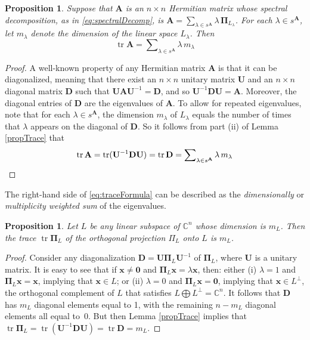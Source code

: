 \documentclass[11pt]{article}
\newcommand \C { \mathbb{C} }
\DeclareMathOperator{\tr}{tr}
\newtheorem{proposition}[theorem]{Proposition}
\begin{document}
\begin{proposition} \label{prop:trace}
	Suppose that $ \mathbf A$ is an $n \times n$ Hermitian matrix 
	whose spectral decomposition, as in \eqref{eq:spectralDecomp},
	is \( \mathbf A = \sum\nolimits _{ \lambda \in s^{ \mathbf A} } 
			\lambda \, \boldsymbol \Pi _{ L_\lambda } \). 
	For each $ \lambda \in s^{ \mathbf A} $, let $ m_\lambda $ denote 
	the dimension of the linear space $ L_\lambda $.
	Then 
\begin{equation} \label{eq:traceFormula}
	\tr \mathbf A = \sum\nolimits _{ \lambda \in s^{ \mathbf A} } \lambda \, m_\lambda
\end{equation}
\end{proposition}

\begin{proof} 
	A well-known property of any Hermitian matrix $ \mathbf A$ is that it can be diagonalized, 
	meaning that there exist an $n \times n$ unitary matrix $ \mathbf U$ 
	and an $n \times n$ diagonal matrix $ \mathbf D$ 
	such that $ \mathbf U \mathbf A \mathbf U^{-1} = \mathbf D$,
	and so $ \mathbf U^{-1} \mathbf D \mathbf U = \mathbf A$. 
	Moreover, the diagonal entries of $ \mathbf D$ are the eigenvalues of $ \mathbf A$.
	To allow for repeated eigenvalues, note that for each $ \lambda \in s^{ \mathbf A} $, 
	the dimension $ m_\lambda $ of $ L_\lambda $ equals the number of times that $ \lambda $ 
	appears on the diagonal of $ \mathbf D$.
	So it follows from part (ii) of Lemma \ref{propTrace} that
\[ \tr \mathbf A = \tr ( \mathbf U^{-1} \mathbf D \mathbf U ) 
	= \tr \mathbf D = \sum\nolimits _{ \lambda \in s^{ \mathbf A} } \lambda \, m_\lambda 
	\qedhere \]
\end{proof}

The right-hand side of \eqref{eq:traceFormula} can be described
as the \emph{dimensionally} or \emph{multiplicity weighted sum} of the eigenvalues.

\begin{proposition} \label{prop:traceProj}
	Let $L$ be any linear subspace of $ \C^n $ whose dimension is $ m_L $.
	Then the trace $ \tr \boldsymbol \Pi _L $ of the orthogonal projection $ \Pi _L $
	onto $L$ is $ m_L $.
\end{proposition}

\begin{proof}
	Consider any diagonalization $ \mathbf D = \mathbf U \boldsymbol \Pi _L \mathbf U^{-1} $ 
	of $ \boldsymbol \Pi _L $, where $ \mathbf U$ is a unitary matrix.
	It is easy to see that if $ \mathbf x \ne \mathbf 0$ 
	and $ \boldsymbol \Pi _L \mathbf x = \lambda \mathbf x$, then:
	either (i) $ \lambda = 1$ and $ \boldsymbol \Pi _L \mathbf x = \mathbf x$,
	implying that $ \mathbf x \in L$;
	or (ii) $ \lambda = 0$ and $ \boldsymbol \Pi _L \mathbf x = \mathbf 0$,
	implying that $ \mathbf x \in L^\perp $, the orthogonal complement of $L$
	that satisfies $L \bigoplus L^\perp = \C^n $.
	It follows that $ \mathbf D$ has $ m_L $ diagonal elements equal to 1,
	with the remaining $n - m_L $ diagonal elements all equal to~0.
	But then Lemma \ref{propTrace} implies that 
 \( \tr \boldsymbol \Pi _L = \tr ( \mathbf U^{-1} \mathbf D \mathbf U) = \tr \mathbf D = m_L \).
\end{proof}
\end{document}
